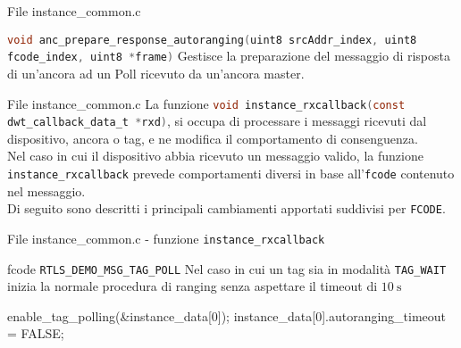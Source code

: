 \begin{frame}{File instance\_common.c}
  \begin{block}{\lstinline[language=C]!void anc_prepare_response_autoranging(uint8 srcAddr_index, uint8 fcode_index, uint8 *frame)! \newfunction}
    Gestisce la preparazione del messaggio di risposta di un'ancora ad un Poll ricevuto da un'ancora master.
  \end{block}
\end{frame}

\begin{frame}{File instance\_common.c}
  La funzione \lstinline[language=C]!void instance_rxcallback(const dwt_callback_data_t *rxd)!,
  si occupa di processare i messaggi ricevuti dal dispositivo,
  ancora o tag, e ne modifica il comportamento di consenguenza.\\
  Nel caso in cui il dispositivo abbia ricevuto un messaggio valido, la funzione \lstinline[language=C]!instance_rxcallback!
  prevede comportamenti diversi in base all'\lstinline[language=C]!fcode! contenuto nel messaggio.\\
  Di seguito sono descritti i principali \alert{cambiamenti} apportati suddivisi
  per \lstinline[language=C]!FCODE!.
\end{frame}

\begin{frame}[fragile]{File instance\_common.c - funzione \lstinline[language=C]!instance_rxcallback!}
  \begin{block}{fcode \lstinline[language=C]!RTLS_DEMO_MSG_TAG_POLL!}
    Nel caso in cui un tag sia in modalità \lstinline[language=C]!TAG_WAIT! inizia la normale procedura di ranging senza aspettare il timeout di $\SI{10}{\second}$
    \begin{C}
      enable_tag_polling(&instance_data[0]);
      instance_data[0].autoranging_timeout = FALSE;
    \end{C}
  \end{block}
\end{frame}

